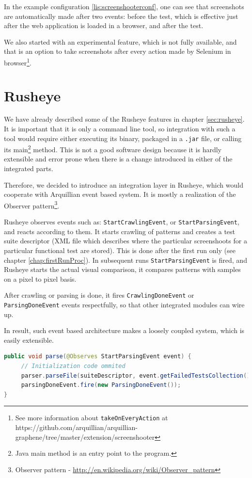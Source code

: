 \documentclass[11pt,oneside,final]{fithesis2}
\begin{document}
In the example configuration \ref{lis:screenshooterconf}, one can see that screenshots are automatically 
made after two events: before the test, which is effective just after the web application is loaded in 
a browser, and after the test. 

We also started with an experimental feature, which is not fully available, and that is an option
to take screenshots after every action made by Selenium in browser\footnote{See more information 
about \texttt{takeOnEveryAction} at https://github.com/arquillian/arquillian-graphene/tree/master/extension/screenshooter}.
  
\section{Rusheye}
We have already described some of the Rusheye features in chapter \ref{sec:rusheye}. It is important that it
is only a command line tool, so integration with such a tool would require either executing its binary,
packaged in a \texttt{.jar} file, or calling its main\footnote{Java main method is an entry point
to the program.} method. This is not a good software design because it is hardly extensible and error prone
when there is a change introduced in either of the integrated parts.

Therefore, we decided to introduce an integration layer in Rusheye, which would cooperate with Arquillian event based system.
It is mostly a realization of the Observer pattern\footnote{Observer pattern - \url{http://en.wikipedia.org/wiki/Observer_pattern}}.

Rusheye observes events such as: \texttt{StartCrawlingEvent}, or \texttt{StartParsingEvent}, and reacts according to them. It starts
crawling of patterns and creates a test suite descriptor (XML file which describes where the particular screenshoots for a particular
functional test are stored). This is done after the first run only (see chapter \ref{chap:firstRunProc}). In subsequent runs \texttt{StartParsingEvent}
is fired, and Rusheye starts the actual visual comparison, it compares patterns with samples on a pixel to pixel basis.

After crawling or parsing is done, it fires \texttt{CrawlingDoneEvent} or \texttt{ParsingDoneEvent} events respectfully, so that other integrated
modules can wire up.

In result, such event based architecture makes a loosely coupled system, which is easily extensible.

\begin{lstlisting}[caption=Example of StartParsingEvent observer,label=lis:startParsingObserver,language=java, breaklines=true]
public void parse(@Observes StartParsingEvent event) {
     // Initialization code ommited
     parser.parseFile(suiteDescriptor, event.getFailedTestsCollection());
     parsingDoneEvent.fire(new ParsingDoneEvent());
}
\end{lstlisting}
  
\end{document}
